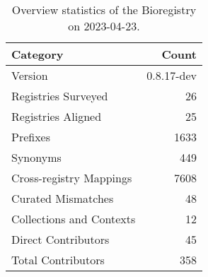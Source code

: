 \begin{table}
\caption{Overview statistics of the Bioregistry on 2023-04-23.}
\label{tab:bioregistry-summary}
\begin{tabular}{lr}
\toprule
Category & Count \\
\midrule
Version & 0.8.17-dev \\
Registries Surveyed & 26 \\
Registries Aligned & 25 \\
Prefixes & 1633 \\
Synonyms & 449 \\
Cross-registry Mappings & 7608 \\
Curated Mismatches & 48 \\
Collections and Contexts & 12 \\
Direct Contributors & 45 \\
Total Contributors & 358 \\
\bottomrule
\end{tabular}
\end{table}
